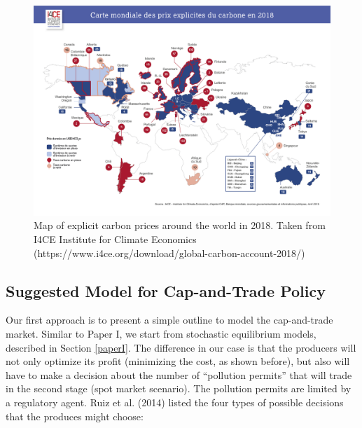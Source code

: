 \documentclass[11pt, letterpaper]{article}
\begin{document}
\begin{figure}[ht!]
 \includegraphics[width=\textwidth]{Informe/Carte-prix-du-carbone.png}
 
 \caption{Map of explicit carbon prices around the world in 2018. Taken from I4CE Institute for Climate Economics (https://www.i4ce.org/download/global-carbon-account-2018/)}
 \label{map-carbon-price}
\end{figure}

\subsection{Suggested Model for Cap-and-Trade Policy}
Our first approach is to present a simple outline to model the cap-and-trade market. Similar to Paper I, we start from stochastic equilibrium models, described in Section \ref{paperI}. The difference in our case is that the producers will not only optimize its profit (minimizing the cost, as shown before), but also will have to make a decision about the number of ``pollution permits'' that will trade in the second stage (spot market scenario). The pollution permits are limited by a regulatory agent. Ruiz et al. (2014) listed the four types of possible decisions that the produces might choose:
\end{document}
